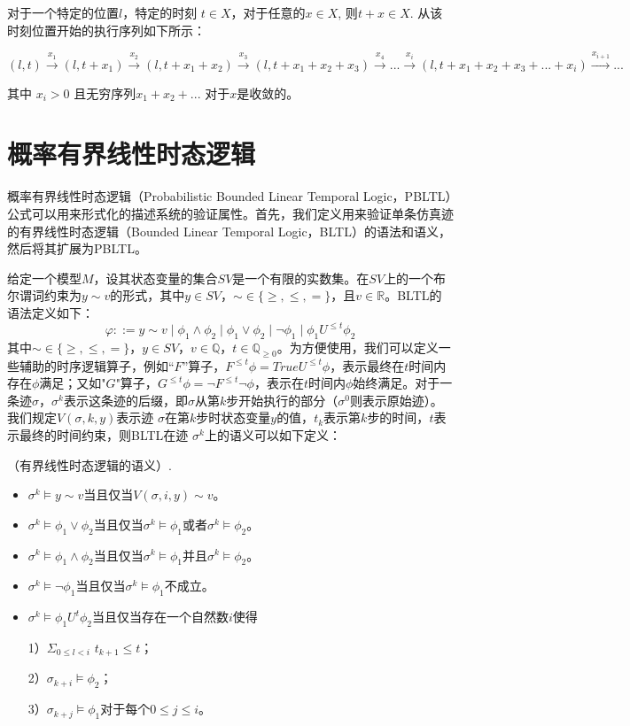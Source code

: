 对于一个特定的位置$l$，特定的时刻 $t \in X$，对于任意的$x \in X$, 则$t + x \in X$. 从该时刻位置开始的执行序列如下所示：

$(l,t) \xrightarrow{x_{1}} (l,t+x_{1}) \xrightarrow{x_{2}} (l,t+x_{1}+x_{2}) \xrightarrow{x_{3}} (l,t+x_{1}+x_{2}+x_{3}) \xrightarrow{x_{4}}...\xrightarrow{x_{i}}(l,t+x_{1}+x_{2}+x_{3}+...+x_{i}) \xrightarrow{x_{i+1}}...$

其中 $x_{i} > 0$ 且无穷序列$x_{1} + x_{2} + . . .$ 对于$x$是收敛的。 

\section{概率有界线性时态逻辑}
概率有界线性时态逻辑（Probabilistic Bounded Linear Temporal Logic，PBLTL）公式可以用来形式化的描述系统的验证属性。首先，我们定义用来验证单条仿真迹的有界线性时态逻辑（Bounded Linear Temporal Logic，BLTL）的语法和语义，然后将其扩展为PBLTL。

给定一个模型$M$，设其状态变量的集合$SV$是一个有限的实数集。在$SV$上的一个布尔谓词约束为$y \sim v$的形式，其中$y\in SV$，$\sim \in \lbrace \geq,\leq,=\rbrace$，且$v\in \mathbb{R}$。BLTL的语法定义如下：
$$\varphi ::= y \sim v\mid\phi_{1}\wedge\phi_{2}\mid\phi_{1}\vee\phi_{2}\mid \neg \phi_{1}\mid\phi_{1}U^{\leq t}\phi_{2}
$$
其中$\sim \in \lbrace \geq,\leq,=\rbrace$，$y\in SV$，$v\in \mathbb{Q}$，$t\in \mathbb{Q}_{\geq 0}$。为方便使用，我们可以定义一些辅助的时序逻辑算子，例如“$F$”算子，$F^{\leq t}\phi = True U^{\leq t}\phi$，表示最终在$t$时间内存在$\phi$满足；又如"$G$"算子，$G^{\leq t}\phi = \neg F^{\leq t}\neg \phi$，表示在$t$时间内$\phi$始终满足。对于一条迹$\sigma$，$\sigma^k$表示这条迹的后缀，即$\sigma$从第$k$步开始执行的部分（$\sigma^0$则表示原始迹）。我们规定$V(\sigma,k,y)$表示迹 $\sigma$在第$k$步时状态变量$y$的值，$t_k$表示第$k$步的时间，$t$表示最终的时间约束，则BLTL在迹 $\sigma^k$上的语义可以如下定义：

\begin{define}\label{def:bltl_semantics}
（有界线性时态逻辑的语义）.	
\begin{itemize}
\item $\sigma^{k}\vDash y \sim v $当且仅当$V(\sigma,i,y)\sim v$。
\item $\sigma^{k}\vDash\phi_{1}\vee\phi_{2}$当且仅当$\sigma^{k}\vDash\phi_{1}$或者$\sigma^{k}\vDash\phi_{2}$。
\item $\sigma^{k}\vDash\phi_{1}\wedge\phi_{2}$当且仅当$\sigma^{k}\vDash\phi_{1}$并且$\sigma^{k}\vDash\phi_{2}$。
\item $\sigma^{k}\vDash\neg\phi_{1}$当且仅当$\sigma^{k}\vDash\phi_{1}$不成立。
\item $\sigma^{k}\vDash\phi_{1}U^{t}\phi_{2}$当且仅当存在一个自然数$i$使得

1）$ \Sigma_{0\leq l<i}$ $t_{k+1}\leq t$；

2）$ \sigma_{k+i}\models\phi_{2}$；

3）$\sigma_{k+j}\models\phi_{1}$对于每个$ 0\leq j \leq i$。
\end{itemize}
\end{define}

